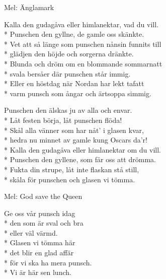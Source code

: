 \pagestyle{Punschvisor}
\begin{SongText}[Änglapunschen]
    \begin{SongInfo}
        Mel: Änglamark
    \end{SongInfo}
    \begin{SongVerse}
        Kalla den gudagåva eller himlanektar, vad du vill.\\*%
        Punschen den gyllne, de gamle oss skänkte.\\*%
        Vet att så länge som punschen nånsin funnits till\\*%
        glädjen den höjde och sorgerna dränkte.\\*%
        Blunda och dröm om en blommande sommarnatt\\*%
        svala bersåer där punschen står immig.\\*%
        Eller en höstdag när Nordan har lekt tafatt\\*%
        varm punsch som ångar och ärtsoppa simmig.
    \end{SongVerse}
    \begin{SongVerse}
        Punschen den älskas ju av alla och envar.\\*%
        Låt festen börja, låt punschen flöda!\\*%
        Skål alla vänner som har nåt' i glasen kvar,\\*%
        hedra nu minnet av gamle kung Oscars da'r!\\*%
        Kalla den gudagåva eller himlanektar om du vill.\\*%
        Punschen den gyllene, som får oss att drömma.\\*%
        Fukta din strupe, låt inte flaskan stå still,\\*%
        skåla för punschen och glasen vi tömma.
    \end{SongVerse}\end{SongText}
\begin{SongText}
    \begin{SongInfo}
        Mel: God save the Queen
    \end{SongInfo}
    \begin{SongVerse}
        Ge oss vår punsch idag\\*%
        den som är sval och bra\\*%
        eller väl värmd.\\*%
        Glasen vi tömma här\\*%
        det blir en glad affär\\*%
        för vi ska ha mera punsch.\\*%
        Vi är här sen lunch.
    \end{SongVerse}\end{SongText}
